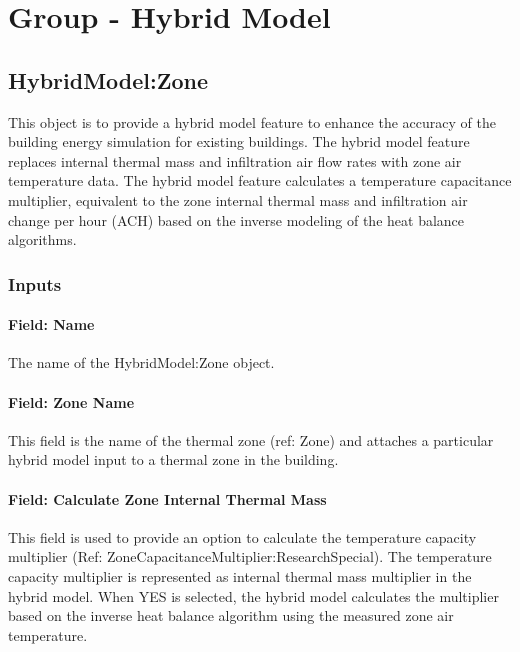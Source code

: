 \section{Group - Hybrid Model}\label{group---hybrid-model}

\subsection{HybridModel:Zone}\label{hybridmodel-zone}

This object is to provide a hybrid model feature to enhance the accuracy of the building energy simulation for existing buildings. The hybrid model feature replaces internal thermal mass and infiltration air flow rates with zone air temperature data. The hybrid model feature calculates a temperature capacitance multiplier, equivalent to the zone internal thermal mass and infiltration air change per hour (ACH) based on the inverse modeling of the heat balance algorithms. 

\subsubsection{Inputs}\label{inputs-hm}

\paragraph{Field: Name}\label{field-name-hm}

The name of the HybridModel:Zone object.

\paragraph{Field: Zone Name}\label{field-zone-name-hm}

This field is the name of the thermal zone (ref: Zone) and attaches a particular hybrid model input to a thermal zone in the building.

\paragraph{Field: Calculate Zone Internal Thermal Mass}\label{field-calculate-zon-internal-thermal-mass-hm}

This field is used to provide an option to calculate the temperature capacity multiplier (Ref: ZoneCapacitanceMultiplier:ResearchSpecial). The temperature capacity multiplier is represented as internal thermal mass multiplier in the hybrid model. 
When YES is selected, the hybrid model calculates the multiplier based on the inverse heat balance algorithm using the measured zone air temperature.


